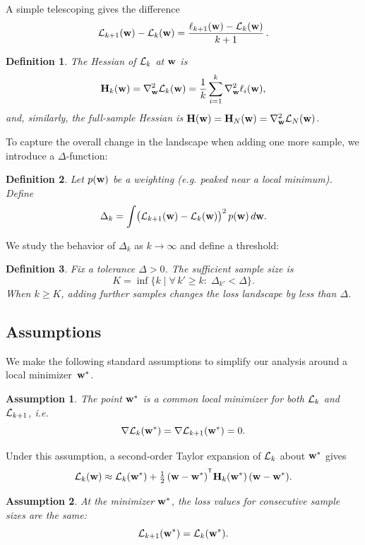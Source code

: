 \documentclass{article}
\newtheorem{definition}{Definition}
\newtheorem{assumption}{Assumption}
\begin{document}
A simple telescoping gives the difference
$$
  \mathcal{L}_{k+1}(\mathbf{w}) - \mathcal{L}_k(\mathbf{w}) =
  \frac{\ell_{k+1}(\mathbf{w}) - \mathcal{L}_k(\mathbf{w})}{k+1}\,.
$$

\begin{definition}
  The Hessian of $\mathcal{L}_k$ at $\mathbf{w}$ is
  $$
    \mathbf{H}_k(\mathbf{w}) =
    \nabla^2_{\mathbf{w}} \mathcal{L}_k(\mathbf{w}) =
    \frac1k \sum_{i=1}^k \nabla^2_{\mathbf{w}} \ell_i(\mathbf{w}),
  $$
  and, similarly, the full-sample Hessian is $\mathbf{H}(\mathbf{w}) = \mathbf{H}_N(\mathbf{w}) = \nabla^2_{\mathbf{w}} \mathcal{L}_N(\mathbf{w})$.
\end{definition}

To capture the overall change in the landscape when adding one more sample, we introduce a $\Delta$‑function:

\begin{definition}
  Let $p(\mathbf{w})$ be a weighting (e.g. peaked near a local minimum). Define
  $$
    \Delta_k =
    \int \bigl( \mathcal{L}_{k+1}(\mathbf{w}) - \mathcal{L}_k(\mathbf{w}) \bigr)^2\, p(\mathbf{w})\, d\mathbf{w}.
  $$
\end{definition}

We study the behavior of $\Delta_k$ as $k \to \infty$ and define a threshold:

\begin{definition}
  Fix a tolerance $\Delta > 0$. The \emph{sufficient sample size} is
  $$
    K =
    \inf \{ k \mid \forall\, k' \ge k : \; \Delta_{k'} < \Delta\}.
  $$
  When $k \ge K$, adding further samples changes the loss landscape by less than $\Delta$.
\end{definition}

\subsection{Assumptions}

We make the following standard assumptions to simplify our analysis around a local minimizer~$\mathbf{w}^*$.

\begin{assumption}
  The point $\mathbf{w}^*$ is a common local minimizer for both $\mathcal{L}_k$ and $\mathcal{L}_{k+1}$, i.e.
  $$
    \nabla \mathcal{L}_k(\mathbf{w}^*) =
    \nabla \mathcal{L}_{k+1}(\mathbf{w}^*) =
    0.
  $$
\end{assumption}

Under this assumption, a second‑order Taylor expansion of $\mathcal{L}_k$ about $\mathbf{w}^*$ gives
$$
  \cL_k(\bw) \approx
  \cL_k(\bw^*) + \tfrac12\, (\bw - \bw^*)^{\T} \bH_k(\bw^*)\, (\bw - \bw^*).
$$

\begin{assumption}
  At the minimizer $\mathbf{w}^*$, the loss values for consecutive sample sizes are the same:
  $$
    \mathcal{L}_{k+1}(\mathbf{w}^*) =
    \mathcal{L}_k(\mathbf{w}^*).
  $$
\end{assumption}
\end{document}
